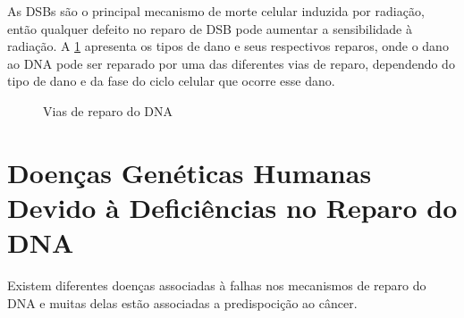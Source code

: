 \documentclass[11pt,a4paper]{article}
\begin{document}
	As DSBs são o principal mecanismo de morte celular induzida por radiação, então qualquer defeito no reparo de DSB pode aumentar a sensibilidade à radiação. A \ref{fig:danoEReparonoDna} apresenta os tipos de dano e seus respectivos reparos, onde o dano ao DNA pode ser reparado por uma das diferentes vias de reparo, dependendo do tipo de dano e da fase do ciclo celular que ocorre esse dano.

	\begin{figure}[h]
		\centering
		\caption{Vias de reparo do DNA}
		\label{fig:danoEReparonoDna}
	\end{figure}

\section{Doenças Genéticas Humanas Devido à Deficiências no Reparo do DNA}

	Existem diferentes doenças associadas à falhas nos mecanismos de reparo do DNA e muitas delas estão associadas a predispocição ao câncer.
\end{document}
